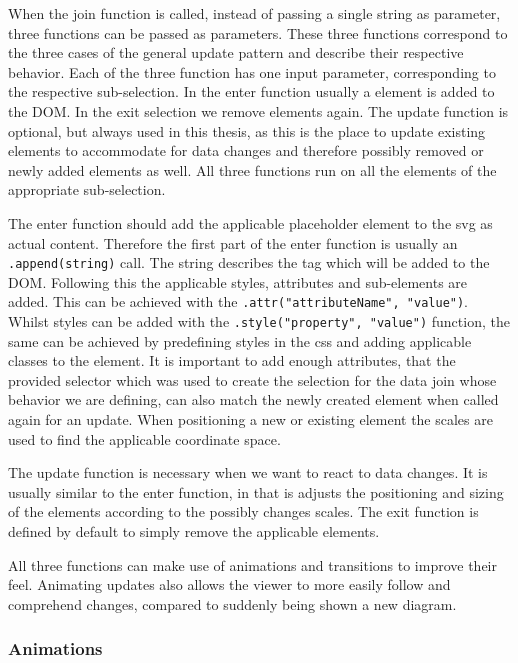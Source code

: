 When the join function is called, instead of passing a single string as parameter, three functions can be passed as parameters. These three functions correspond to the three cases of the general update pattern and describe their respective behavior. Each of the three function has one input parameter, corresponding to the respective sub-selection. In the enter function usually a element is added to the DOM. In the exit selection we remove elements again. The update function is optional, but always used in this thesis, as this is the place to update existing elements to accommodate for data changes and therefore possibly removed or newly added elements as well. All three functions run on all the elements of the appropriate sub-selection.

The enter function should add the applicable placeholder element to the svg as actual content. Therefore the first part of the enter function is usually an \verb|.append(string)| call. The string describes the tag which will be added to the DOM. Following this the applicable styles, attributes and sub-elements are added. This can be achieved with the \verb|.attr("attributeName", "value")|. Whilst styles can be added with the \verb|.style("property", "value")| function, the same can be achieved by predefining styles in the css and adding applicable classes to the element. It is important to add enough attributes, that the provided selector which was used to create the selection for the data join whose behavior we are defining, can also match the newly created element when called again for an update. When positioning a new or existing element the  scales are used to find the applicable coordinate space.

The update function is necessary when we want to react to data changes. It is usually similar to the enter function, in that is adjusts the positioning and sizing of the elements according to the possibly changes scales. The exit function is defined by default to simply remove the applicable elements.

All three functions can make use of animations and transitions to improve their feel. Animating updates also allows the viewer to more easily follow and comprehend changes, compared to suddenly being shown a new diagram.

\subsubsection{Animations}

